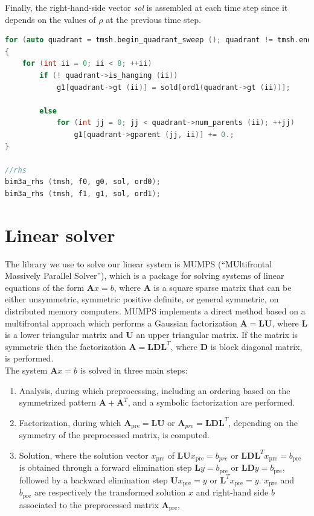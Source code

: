 \documentclass{Configuration_Files/PoliMi3i_thesis}
\begin{document}
Finally, the right-hand-side vector \textit{sol} is assembled at each time step since it depends on the values of $\rho$ at the previous time step. 
\begin{lstlisting}[language=C++]
for (auto quadrant = tmsh.begin_quadrant_sweep (); quadrant != tmsh.end_quadrant_sweep (); ++quadrant)
{
    for (int ii = 0; ii < 8; ++ii)
        if (! quadrant->is_hanging (ii))
            g1[quadrant->gt (ii)] = sold[ord1(quadrant->gt (ii))];
          
        else
            for (int jj = 0; jj < quadrant->num_parents (ii); ++jj)
                g1[quadrant->gparent (jj, ii)] += 0.;
}
    
//rhs
bim3a_rhs (tmsh, f0, g0, sol, ord0);
bim3a_rhs (tmsh, f1, g1, sol, ord1);
\end{lstlisting}
\section{Linear solver}
The library we use to solve our linear system is MUMPS \cite{MUMPS} (“MUltifrontal Massively Parallel Solver”), which is a package for solving systems of linear equations of the form $\bm{A}x = b$, where $\bm{A}$ is a square sparse matrix that can be either unsymmetric, symmetric positive definite, or general symmetric, on distributed memory computers. MUMPS implements a direct method based on a multifrontal approach which performs a Gaussian factorization $\bm{A} = \bm{L}\bm{U}$,
where $\bm{L}$ is a lower triangular matrix and $\bm{U}$ an upper triangular matrix. If the matrix is symmetric then the factorization $\bm{A} = \bm{L}\bm{D}\bm{L}^T$, where $\bm{D}$ is block diagonal matrix, is performed.
\\The system $\bm{A}x = b$ is solved in three main steps:
\begin{enumerate}
    \item Analysis, during which preprocessing, including an ordering based on the symmetrized pattern $\bm{A}+\bm{A}^T$, and a symbolic factorization are performed.
    \item Factorization, during which $\bm{A}_\text{pre} = \bm{L}\bm{U}$ or $\bm{A}_{pre} = \bm{L}\bm{D}\bm{L}^T$, depending on the symmetry of the preprocessed matrix, is computed.
    \item Solution, where the solution vector $x_\text{pre}$ of $\bm{L}\bm{U}x_\text{pre} = b_{pre}$ or $\bm{L}\bm{D}\bm{L}^T x_\text{pre} = b_\text{pre}$ is obtained through a forward elimination step $\bm{L}y = b_\text{pre}$ or $\bm{L}\bm{D}y = b_\text{pre}$, followed by a backward elimination step $\bm{U}x_\text{pre} = y$ or $\bm{L}^Tx_\text{pre} = y$. $x_\text{pre}$ and $b_\text{pre}$ are respectively the transformed solution $x$ and right-hand side $b$ associated to the preprocessed matrix $\bm{A}_\text{pre}$, 
\end{enumerate}
\end{document}
